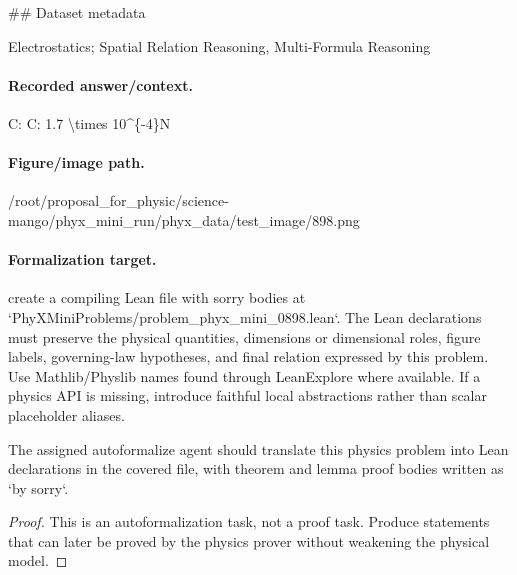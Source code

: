 \#\# Dataset metadata

Electrostatics; Spatial Relation Reasoning, Multi-Formula Reasoning

\paragraph{Recorded answer/context.}
C: C: 1.7 \textbackslash{}times 10\textasciicircum{}\{-4\}N

\paragraph{Figure/image path.}
/root/proposal\_for\_physic/science-mango/phyx\_mini\_run/phyx\_data/test\_image/898.png

\paragraph{Formalization target.}
create a compiling Lean file with sorry bodies at `PhyXMiniProblems/problem\_phyx\_mini\_0898.lean`. The Lean declarations must preserve the physical quantities, dimensions or dimensional roles, figure labels, governing-law hypotheses, and final relation expressed by this problem.
Use Mathlib/Physlib names found through LeanExplore where available. If a physics API is missing, introduce faithful local abstractions rather than scalar placeholder aliases.

\begin{theorem}
\label{thm:physics:phyx_mini_0898:target}
The assigned autoformalize agent should translate this physics problem into Lean declarations in the covered file, with theorem and lemma proof bodies written as `by sorry`.
\end{theorem}
\begin{proof}
This is an autoformalization task, not a proof task. Produce statements that can later be proved by the physics prover without weakening the physical model.
\end{proof}

